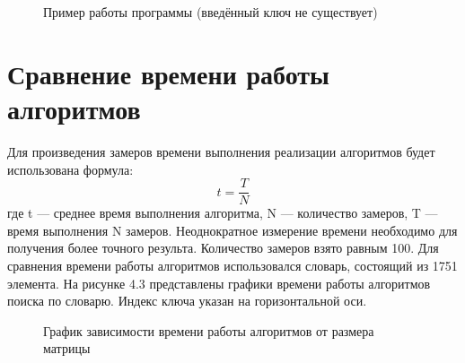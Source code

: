 \documentclass[12pt]{report}
\begin{document}
\begin{figure}[ht!]
	\caption{Пример работы программы (введённый ключ не существует)}
\end{figure}


\newpage
\section{Сравнение времени работы алгоритмов}
Для произведения замеров времени выполнения реализации алгоритмов будет использована формула: \begin{equation}\label{eq:fourierrow}
	t = \frac{T}{N}
\end{equation}
где t — среднее время выполнения алгоритма, N — количество замеров, T — время выполнения N замеров.  
Неоднократное измерение времени необходимо для получения более точного результа.  
Количество замеров взято равным 100. Для сравнения времени работы алгоритмов использовался словарь, состоящий из 1751 элемента. На рисунке 4.3 представлены графики времени работы алгоритмов поиска по словарю. Индекс ключа указан на горизонтальной оси.


\begin{figure}[ht!]
	\caption{График зависимости времени работы алгоритмов от размера матрицы}
\end{figure}
\end{document}
